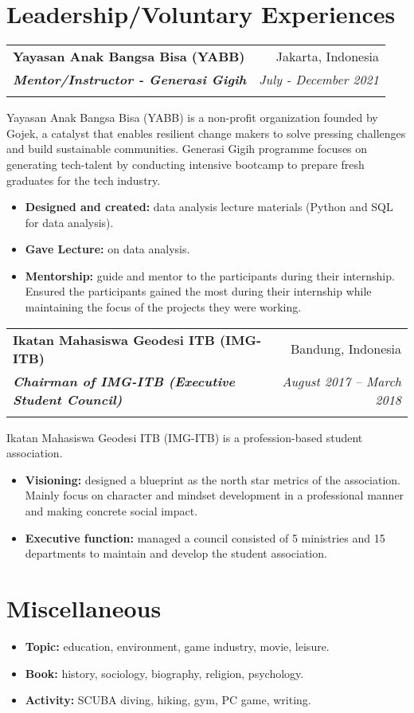 \documentclass[a4paper, 11pt]{article}
\makeatletter
\newcommand{\resumeItem}[2]{
    \item\small{
        \textbf{#1}{#2 \vspace{-2pt}}
    }
}
\newcommand{\resumeSubheading}[4]{
    \vspace{-1pt}
    \begin{tabular*}{0.97\textwidth}{l@{\extracolsep{\fill}}r}
        \color{lightblue}\textbf{#1} & #2 \\
        \textbf{\textit{\small#3}} & \textit{\small #4} \\
        \textnormal{}\vspace{-5pt}
    \end{tabular*}\vspace{-5pt}
}
\newcommand{\resumeItemListStart}{\begin{itemize}[leftmargin=*]\setlength\itemsep{0em}\vspace{-1pt}}
\newcommand{\resumeItemListEnd}{\end{itemize}\vspace{-5pt}}
\makeatother
\begin{document}
    \vspace{-5pt}
    \section{Leadership/Voluntary Experiences}

    \resumeSubheading
    {Yayasan Anak Bangsa Bisa (YABB)}
    {Jakarta, Indonesia}
    {Mentor/Instructor - Generasi Gigih}
    {July - December 2021}
    {Yayasan Anak Bangsa Bisa (YABB) is a non-profit organization founded by Gojek, a catalyst that enables resilient change makers to
    solve pressing challenges and build sustainable communities. Generasi Gigih programme focuses on generating tech-talent by
    conducting intensive bootcamp to prepare fresh graduates for the tech industry.}
    \vspace{-5pt}
    \resumeItemListStart
    \resumeItem{Designed and created:}{ data analysis lecture materials (Python and SQL for data analysis).}
    \resumeItem{Gave Lecture:}{ on data analysis.}
    \resumeItem{Mentorship:}{ guide and mentor to the participants during their internship. Ensured the participants gained the most during their
    internship while maintaining the focus of the projects they were working.}
    \resumeItemListEnd

    \vspace{5pt}
    \resumeSubheading
    {Ikatan Mahasiswa Geodesi ITB (IMG-ITB)}
    {Bandung, Indonesia}
    {Chairman of IMG-ITB (Executive Student Council)}
    {August 2017 – March 2018}
    {Ikatan Mahasiswa Geodesi ITB (IMG-ITB) is a profession-based student association.}
    \vspace{-5pt}
    \resumeItemListStart
    \resumeItem{Visioning:}{ designed a blueprint as the north star metrics of the association. Mainly focus on character and mindset development in a
    professional manner and making concrete social impact.}
    \resumeItem{Executive function:}{ managed a council consisted of 5 ministries and 15 departments to maintain and develop the student association.}
    \resumeItemListEnd

    \vspace{-5pt}
    \section{Miscellaneous}

    \resumeItemListStart
    \resumeItem{Topic:}{ education, environment, game industry, movie, leisure.}
    \resumeItem{Book:}{ history, sociology, biography, religion, psychology.}
    \resumeItem{Activity:}{ SCUBA diving, hiking, gym, PC game, writing.}
    \resumeItemListEnd
\end{document}
